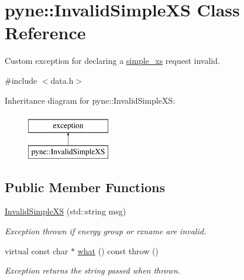 \hypertarget{classpyne_1_1_invalid_simple_x_s}{}\section{pyne\+:\+:Invalid\+Simple\+XS Class Reference}
\label{classpyne_1_1_invalid_simple_x_s}


Custom exception for declaring a \hyperlink{structsimple__xs}{simple\+\_\+xs} request invalid.  




{\ttfamily \#include $<$data.\+h$>$}

Inheritance diagram for pyne\+:\+:Invalid\+Simple\+XS\+:\begin{figure}[H]
\begin{center}
\leavevmode
\includegraphics[height=2.000000cm]{classpyne_1_1_invalid_simple_x_s}
\end{center}
\end{figure}
\subsection*{Public Member Functions}
\begin{DoxyCompactItemize}
\item 
\hyperlink{classpyne_1_1_invalid_simple_x_s_ad3bac5f587ea476c11a622024914d074}{Invalid\+Simple\+XS} (std\+::string msg)\hypertarget{classpyne_1_1_invalid_simple_x_s_ad3bac5f587ea476c11a622024914d074}{}\label{classpyne_1_1_invalid_simple_x_s_ad3bac5f587ea476c11a622024914d074}

\begin{DoxyCompactList}\small\item\em Exception thrown if energy group or rxname are invalid. \end{DoxyCompactList}\item 
virtual const char $\ast$ \hyperlink{classpyne_1_1_invalid_simple_x_s_aaafdfd9422833d680a00d7c00263b04a}{what} () const   throw ()\hypertarget{classpyne_1_1_invalid_simple_x_s_aaafdfd9422833d680a00d7c00263b04a}{}\label{classpyne_1_1_invalid_simple_x_s_aaafdfd9422833d680a00d7c00263b04a}

\begin{DoxyCompactList}\small\item\em Exception returns the string passed when thrown. \end{DoxyCompactList}\end{DoxyCompactItemize}


